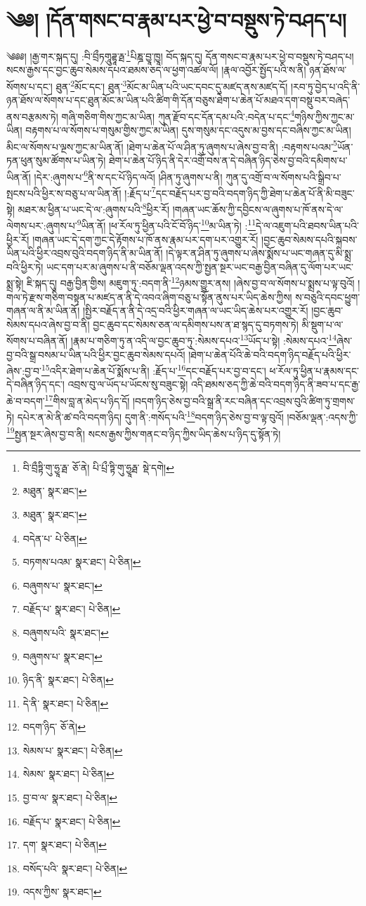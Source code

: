 \setcounter{footnote}{0} 
\chapter{༄༅། །དོན་གསང་བ་རྣམ་པར་ཕྱེ་བ་བསྡུས་ཏེ་བཤད་པ།}༄༅༅། །རྒྱ་གར་སྐད་དུ། :བི་བྲྀཏགཱུཌྷཱ་རྠ་\footnote{བི་བྲྀཏྟི་གུ་ཧྱཱ་རྠ་  ཅོ་ནེ། པི་པྲྀ་ཏྟི་གུ་ཧྱཱརྠ་  སྡེ་དགེ། }པིཎྜ་བྱཱ་ཁྱཱ། བོད་སྐད་དུ། དོན་གསང་བ་རྣམ་པར་ཕྱེ་བ་བསྡུས་ཏེ་བཤད་པ། སངས་རྒྱས་དང་བྱང་ཆུབ་སེམས་དཔའ་ཐམས་ཅད་ལ་ཕྱག་འཚལ་ལོ། །རྣལ་འབྱོར་སྤྱོད་པའི་ས་ནི། ཉན་ཐོས་ལ་སོགས་པ་དང་། ཐུན་\footnote{མཐུན་  སྣར་ཐང་། }མོང་དང་། ཐུན་\footnote{མཐུན་  སྣར་ཐང་། }མོང་མ་ཡིན་པའི་ཡང་དབང་དུ་མཛད་ནས་མཛད་དོ། །རབ་ཏུ་བྱེད་པ་འདི་ནི་ཉན་ཐོས་ལ་སོགས་པ་དང་ཐུན་མོང་མ་ཡིན་པའི་ཚིག་གི་དོན་བཅུས་ཐེག་པ་ཆེན་པོ་མཐའ་དག་བསྡུ་བར་བཞེད་ནས་བརྩམས་ཏེ། གཞི་གཅིག་གིས་ཀྱང་མ་ཡིན། ཀུན་རྫོབ་དང་དོན་དམ་པའི་:བདེན་པ་དང་\footnote{བདེན་པ་  པེ་ཅིན། }གཉིས་ཀྱིས་ཀྱང་མ་ཡིན། བརྟགས་པ་ལ་སོགས་པ་གསུམ་གྱིས་ཀྱང་མ་ཡིན། དུས་གསུམ་དང་འདུས་མ་བྱས་དང་བཞིས་ཀྱང་མ་ཡིན། མིང་ལ་སོགས་པ་ལྔས་ཀྱང་མ་ཡིན་ནོ། །ཐེག་པ་ཆེན་པོ་ལ་ཤིན་ཏུ་ཞུགས་པ་ཞེས་བྱ་བ་ནི། :བརྟགས་པའམ་\footnote{བཏགས་པའམ་  སྣར་ཐང་།  པེ་ཅིན། }ཡོན་ཏན་ཕུན་སུམ་ཚོགས་པ་ཡིན་ཏེ། ཐེག་པ་ཆེན་པོ་ཉིད་ནི་དེར་འགྲོ་བས་ན་དེ་བཞིན་ཉིད་ཅེས་བྱ་བའི་དམིགས་པ་ཡིན་ནོ། །དེར་:ཞུགས་པ་\footnote{བཞུགས་པ་  སྣར་ཐང་། }ནི་ས་དང་པོ་ཉིད་ལའོ། །ཤིན་ཏུ་ཞུགས་པ་ནི། ཀུན་དུ་འགྲོ་བ་ལ་སོགས་པའི་སྒྲིབ་པ་སྤངས་པའི་ཕྱིར་ས་བཅུ་པ་ལ་ཡིན་ནོ། །:རྗོད་པ་\footnote{བརྗོད་པ་  སྣར་ཐང་།  པེ་ཅིན། }དང་བརྗོད་པར་བྱ་བའི་བདག་ཉིད་ཀྱི་ཐེག་པ་ཆེན་པོ་ནི་མི་བཟུང་སྟེ། མཐར་མ་ཕྱིན་པ་ཡང་དེ་ལ་:ཞུགས་པའི་\footnote{བཞུགས་པའི་  སྣར་ཐང་། }ཕྱིར་རོ། །གཞན་ཡང་ཆོས་ཀྱི་དབྱིངས་ལ་ཞུགས་པ་ཁོ་ནས་དེ་ལ་ལེགས་པར་:ཞུགས་པ་\footnote{བཞུགས་པ་  སྣར་ཐང་། }ཡིན་ནོ། །ཕ་རོལ་ཏུ་ཕྱིན་པའི་ངོ་བོ་ཉིད་\footnote{ཉིད་ནི་  སྣར་ཐང་།  པེ་ཅིན། }མ་ཡིན་ཏེ། :\footnote{དེ་ནི་  སྣར་ཐང་།  པེ་ཅིན། }དེ་ལ་འཇུག་པའི་ཐབས་ཡིན་པའི་ཕྱིར་རོ། །གཞན་ཡང་དེ་དག་ཀྱང་དེ་རྟོགས་པ་ཁོ་ནས་རྣམ་པར་དག་པར་འགྱུར་རོ། །བྱང་ཆུབ་སེམས་དཔའི་སྐབས་ཡིན་པའི་ཕྱིར་འབྲས་བུའི་བདག་ཉིད་ནི་མ་ཡིན་ནོ། །དེ་ལྟར་ན་ཤིན་ཏུ་ཞུགས་པ་ཞེས་སྨོས་པ་ཡང་གཞན་དུ་མི་སྨྲ་བའི་ཕྱིར་ཏེ། ཡང་དག་པར་མ་ཞུགས་པ་ནི་བཅོམ་ལྡན་འདས་ཀྱི་སྤྱན་སྔར་ཡང་བརྒྱ་བྱིན་བཞིན་དུ་ལོག་པར་ཡང་སྨྲ་སྟེ། ཇི་སྐད་དུ། བརྒྱ་བྱིན་གྱིས། མཇུག་ཏུ་:བདག་ནི་\footnote{བདག་ཉིད་  ཅོ་ནེ། }ཉམས་གྱུར་ནས། །ཞེས་བྱ་བ་ལ་སོགས་པ་སྨྲས་པ་ལྟ་བུའོ། །གལ་ཏེ་རྫས་གཅིག་བསྟན་པ་མཛད་ན་ནི་དེ་འབའ་ཞིག་བཅུ་པ་སྟོན་ནུས་པར་ཡིད་ཆེས་ཀྱིས། ས་བཅུའི་དབང་ཕྱུག་གཞན་ལ་ནི་མ་ཡིན་ནོ། །སྤྱིར་བརྗོད་ན་ནི་དེ་འདྲ་བའི་ཕྱིར་གཞན་ལ་ཡང་ཡིད་ཆེས་པར་འགྱུར་རོ། །བྱང་ཆུབ་སེམས་དཔའ་ཞེས་བྱ་བ་ནི། བྱང་ཆུབ་དང་སེམས་ཅན་ལ་དམིགས་པས་ན་ཐ་སྙད་དུ་བཏགས་ཏེ། མི་སྡུག་པ་ལ་སོགས་པ་བཞིན་ནོ། །རྣམ་པ་གཅིག་ཏུ་ན་འདི་ལ་བྱང་ཆུབ་ཏུ་:སེམས་དཔའ་\footnote{སེམས་པ་  སྣར་ཐང་།  པེ་ཅིན། }ཡོད་པ་སྟེ། :སེམས་དཔའ་\footnote{སེམས་  སྣར་ཐང་།  པེ་ཅིན། }ཞེས་བྱ་བའི་སྒྲ་བསམ་པ་ཡིན་པའི་ཕྱིར་བྱང་ཆུབ་སེམས་དཔའོ། །ཐེག་པ་ཆེན་པོའི་ཆེ་བའི་བདག་ཉིད་བརྗོད་པའི་ཕྱིར་ཞེས་:བྱ་བ་\footnote{བྱ་བ་ལ་  སྣར་ཐང་།  པེ་ཅིན། }འདིར་ཐེག་པ་ཆེན་པོ་སྨོས་པ་ནི། :རྗོད་པ་\footnote{བརྗོད་པ་  སྣར་ཐང་།  པེ་ཅིན། }དང་བརྗོད་པར་བྱ་བ་དང་། ཕ་རོལ་ཏུ་ཕྱིན་པ་རྣམས་དང་དེ་བཞིན་ཉིད་དང་། འབྲས་བུ་ལ་ཡོད་པ་ཡོངས་སུ་བཟུང་སྟེ། འདི་ཐམས་ཅད་ཀྱི་ཆེ་བའི་བདག་ཉིད་ནི་ཟབ་པ་དང་རྒྱ་ཆེ་བ་བདག་\footnote{དག་  སྣར་ཐང་།  པེ་ཅིན། }གིས་བླ་ན་མེད་པ་ཉིད་དོ། །བདག་ཉིད་ཅེས་བྱ་བའི་སྒྲ་ནི་རང་བཞིན་དང་འབྲས་བུའི་ཚིག་ཏུ་གྲགས་ཏེ། དཔེར་ན་མེ་ནི་ཚ་བའི་བདག་ཉིད། དུག་ནི་:གསོད་པའི་\footnote{བསོད་པའི་  སྣར་ཐང་།  པེ་ཅིན། }བདག་ཉིད་ཅེས་བྱ་བ་ལྟ་བུའོ། །བཅོམ་ལྡན་:འདས་ཀྱི་\footnote{འདས་ཀྱིས་  སྣར་ཐང་། }སྤྱན་སྔར་ཞེས་བྱ་བ་ནི། སངས་རྒྱས་ཀྱིས་གནང་བ་ཉིད་ཀྱིས་ཡིད་ཆེས་པ་ཉིད་དུ་སྟོན་ཏེ། 